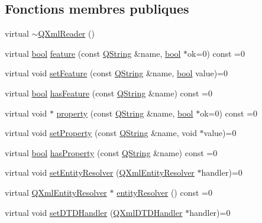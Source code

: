 \subsection*{Fonctions membres publiques}
\begin{DoxyCompactItemize}
\item 
virtual \hyperlink{class_q_xml_reader_a502c745f895f662b77e0699b169dddec}{$\sim$\+Q\+Xml\+Reader} ()
\item 
virtual \hyperlink{qglobal_8h_a1062901a7428fdd9c7f180f5e01ea056}{bool} \hyperlink{class_q_xml_reader_ab23c5f13412bc5298039d278db668941}{feature} (const \hyperlink{class_q_string}{Q\+String} \&name, \hyperlink{qglobal_8h_a1062901a7428fdd9c7f180f5e01ea056}{bool} $\ast$ok=0) const  =0
\item 
virtual void \hyperlink{class_q_xml_reader_a6673b0e33ef628df75410fabdafa3684}{set\+Feature} (const \hyperlink{class_q_string}{Q\+String} \&name, \hyperlink{qglobal_8h_a1062901a7428fdd9c7f180f5e01ea056}{bool} value)=0
\item 
virtual \hyperlink{qglobal_8h_a1062901a7428fdd9c7f180f5e01ea056}{bool} \hyperlink{class_q_xml_reader_a8703006f14cfc2270d3fbfaff5a40a14}{has\+Feature} (const \hyperlink{class_q_string}{Q\+String} \&name) const  =0
\item 
virtual void $\ast$ \hyperlink{class_q_xml_reader_a8fd40ab44965c3b857d6be86d4b786c0}{property} (const \hyperlink{class_q_string}{Q\+String} \&name, \hyperlink{qglobal_8h_a1062901a7428fdd9c7f180f5e01ea056}{bool} $\ast$ok=0) const  =0
\item 
virtual void \hyperlink{class_q_xml_reader_aa02ae81ff9636b9961bc333a68ecffa4}{set\+Property} (const \hyperlink{class_q_string}{Q\+String} \&name, void $\ast$value)=0
\item 
virtual \hyperlink{qglobal_8h_a1062901a7428fdd9c7f180f5e01ea056}{bool} \hyperlink{class_q_xml_reader_aee263aede2672cb222ccc30b1b275f81}{has\+Property} (const \hyperlink{class_q_string}{Q\+String} \&name) const  =0
\item 
virtual void \hyperlink{class_q_xml_reader_a82a810f10ac48cf35d698f57bc2d4647}{set\+Entity\+Resolver} (\hyperlink{class_q_xml_entity_resolver}{Q\+Xml\+Entity\+Resolver} $\ast$handler)=0
\item 
virtual \hyperlink{class_q_xml_entity_resolver}{Q\+Xml\+Entity\+Resolver} $\ast$ \hyperlink{class_q_xml_reader_a2f6900049df8f533cc24b812206d0d0f}{entity\+Resolver} () const  =0
\item 
virtual void \hyperlink{class_q_xml_reader_a0b24b1fe26a4c32a8032d68ee14d5dba}{set\+D\+T\+D\+Handler} (\hyperlink{class_q_xml_d_t_d_handler}{Q\+Xml\+D\+T\+D\+Handler} $\ast$handler)=0

\end{DoxyCompactItemize}
